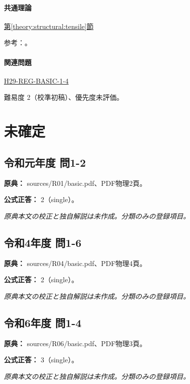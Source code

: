 \paragraph{共通理論} \hyperref[theory:structural:tensile]{第\ref*{theory:structural:tensile}節}

\par 参考：\cite{struct_mit_beam,struct_mit_buckling,struct_mlit_limit}。

\paragraph{関連問題} \hyperref[q:h29-reg-basic-1-4]{H29-REG-BASIC-1-4}

\par 難易度 2（校準初稿）、優先度未評価。

\section{未確定}

\subsection{令和元年度 問1-2}
\label{q:r01-reg-basic-1-2}

\noindent\textbf{原典：} sources/R01/basic.pdf、PDF物理2頁。

\textbf{公式正答：} 2（single）。

\par\textit{原典本文の校正と独自解説は未作成。分類のみの登録項目。}

\subsection{令和4年度 問1-6}
\label{q:r04-reg-basic-1-6}

\noindent\textbf{原典：} sources/R04/basic.pdf、PDF物理4頁。

\textbf{公式正答：} 2（single）。

\par\textit{原典本文の校正と独自解説は未作成。分類のみの登録項目。}

\subsection{令和6年度 問1-4}
\label{q:r06-reg-basic-1-4}

\noindent\textbf{原典：} sources/R06/basic.pdf、PDF物理3頁。

\textbf{公式正答：} 3（single）。

\par\textit{原典本文の校正と独自解説は未作成。分類のみの登録項目。}
